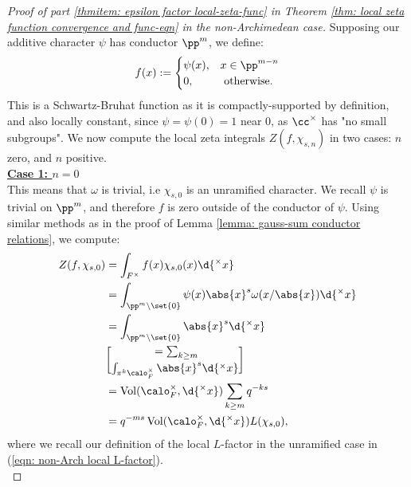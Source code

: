 \documentclass[11pt, x11names, openany]{book}
\begin{document}
\begin{proof}[Proof of part \ref{thmitem: epsilon factor local-zeta-func} in Theorem \ref{thm: local zeta function convergence and func-eqn} in the non-Archimedean case]

Supposing our additive character $\psi$ has conductor $\pp^m$, we define:
\begin{equation}
    \label{eqn: non-arch f in Z(f, chi)}
    f(x) := \begin{cases}
        \psi(x), & x \in \pp^{m-n}\\
        0, & \text{ otherwise}.
    \end{cases}
\end{equation}
This is a Schwartz-Bruhat function as it is compactly-supported by definition, and also locally constant, since $\psi = \psi(0) = 1$ near 0, as $\cc^\times$ has "no small subgroups". We now compute the local zeta integrals $Z(f, \chi_{s, n})$ in two cases: $n$ zero, and $n$ positive.\\

\underline{\textbf{Case 1: $n = 0$}}\\
This means that $\omega$ is trivial, i.e $\chi_{s, 0}$ is an unramified character. We recall $\psi$ is trivial on $\pp^m$, and therefore $f$ is zero outside of the conductor of $\psi$. Using similar methods as in the proof of Lemma \ref{lemma: gauss-sum conductor relations}, we compute:
\begin{align}
\label{eqn: local zeta function non-Arch unramified}
    Z(f, \chi_{s, 0}) &= \int_{F^\times} f(x)\chi_{s, 0}(x) \d{^\times x} \nonumber \\
    &= \int_{\pp^m \setminus \set{0}} \psi(x) \abs{x}^s \omega(x/\abs{x}) \d{^\times x} \nonumber \\
    &= \int_{\pp^m \setminus \set{0}} \abs{x}^s \d{^\times x}\nonumber \\
    &= \sum_{k \geq m} \brack{\int_{\pi^k \calo_F^\times} \abs{x}^s \d{^\times x}}\nonumber \\
    &= \vol(\calo_F^\times, \d{^\times x}) \sum_{k \geq m} q^{-ks}\nonumber \\
    &= q^{-ms} \vol(\calo_F^\times, \d{^\times x} ) L(\chi_{s, 0}),
\end{align}
where we recall our definition of the local $L$-factor in the unramified case in (\ref{eqn: non-Arch local L-factor}).\\


\end{proof}
\end{document}
